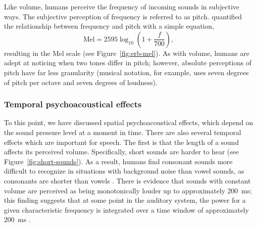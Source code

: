 
Like volume,
humans perceive
the frequency of incoming sounds
in subjective ways.
The subjective perception of frequency
is referred to as pitch.
\citet{stevens1937} quantified
the relationship between
frequency and pitch
with a simple equation,
\begin{equation}
  \text{Mel} = 2595 \log_{10} \left(1 + \frac{f}{700}\right),
\end{equation}
resulting in the Mel scale
(see Figure~\ref{fig:erb-mel}).
As with volume, humans are adept at
noticing when two tones differ in pitch;
however, absolute perceptions of pitch
have far less granularity
(musical notation, for example,
uses seven degrees of pitch per octave
and seven degrees of loudness).

\subsubsection{Temporal psychoacoustical effects}

To this point, we have discussed
spatial psychoacoustical effects,
which depend on
the sound pressure level
at a moment in time.
There are also several temporal effects
which are important for speech.
The first is that the length
of a sound affects its perceived volume.
Specifically, short sounds are harder to hear
(see Figure~\ref{fig:short-sounds}).
As a result, humans find
consonant sounds more difficult
to recognize in situations with background noise
than vowel sounds,
as consonants are shorter than vowels
\citep[Chapter~3]{everest2001}.
There is evidence that sounds with constant volume
are perceived as being monotonically louder
up to approximately 200~ms;
this finding suggests that
at some point in the auditory system,
the power for a given characteristic frequency
is integrated over a time window
of approximately 200~ms
\citep[p.64]{kollmeier2008}.


